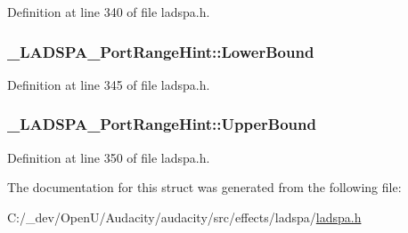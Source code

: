 Definition at line 340 of file ladspa.\+h.

\subsubsection[{\texorpdfstring{Lower\+Bound}{LowerBound}}]{ \+\_\+\+L\+A\+D\+S\+P\+A\+\_\+\+Port\+Range\+Hint\+::\+Lower\+Bound}\hypertarget{struct___l_a_d_s_p_a___port_range_hint_ab4b6718d9f74733d7bf1fb93841b5e67}{}\label{struct___l_a_d_s_p_a___port_range_hint_ab4b6718d9f74733d7bf1fb93841b5e67}


Definition at line 345 of file ladspa.\+h.

\subsubsection[{\texorpdfstring{Upper\+Bound}{UpperBound}}]{ \+\_\+\+L\+A\+D\+S\+P\+A\+\_\+\+Port\+Range\+Hint\+::\+Upper\+Bound}\hypertarget{struct___l_a_d_s_p_a___port_range_hint_ac1a7985c27d0b976ce1f148024d5e363}{}\label{struct___l_a_d_s_p_a___port_range_hint_ac1a7985c27d0b976ce1f148024d5e363}


Definition at line 350 of file ladspa.\+h.



The documentation for this struct was generated from the following file\+:\begin{DoxyCompactItemize}
\item 
C\+:/\+\_\+dev/\+Open\+U/\+Audacity/audacity/src/effects/ladspa/\hyperlink{src_2effects_2ladspa_2ladspa_8h}{ladspa.\+h}\end{DoxyCompactItemize}
